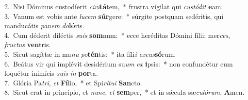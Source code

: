 {2.~}Nisi Dóminus custodíerit \textit{ci}\textit{vi}\textbf{tá}tem,~* frustra vígilat qui \textit{cu}\textit{stó}\textit{dit} \textbf{e}am.\\
{3.~}Vanum est vobis ante \textit{lu}\textit{cem} \textbf{súr}gere:~* súrgite postquam sedéritis, qui manducátis \textit{pa}\textit{nem} \textit{do}\textbf{ló}ris.\\
{4.~}Cum déderit diléctis \textit{su}\textit{is} \textbf{som}num:~* ecce heréditas Dómini fílii: mer\textit{ces}, \textit{fru}\textit{ctus} \textbf{ven}tris.\\
{5.~}Sicut sagíttæ in ma\textit{nu} \textit{po}\textbf{tén}tis:~* ita fíli\textit{i} \textit{ex}\textit{cus}\textbf{só}rum.\\
{6.~}Beátus vir qui implévit desidérium su\textit{um} \textit{ex} \textbf{i}psis:~* non confundétur cum loquétur inimícis \textit{su}\textit{is} \textit{in} \textbf{por}ta.\\
{7.~}Glória Pa\textit{tri}, \textit{et} \textbf{Fí}lio,~* et Spi\textit{rí}\textit{tu}\textit{i} \textbf{San}cto.\\
{8.~}Sicut erat in princípio, et \textit{nunc}, \textit{et} \textbf{sem}per,~* et in sǽcula sæ\textit{cu}\textit{ló}\textit{rum}. \textbf{A}men.\\
